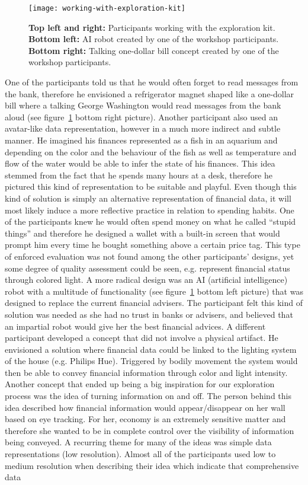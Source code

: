 \begin{figure}[!h]
	\centering
	\texttt{[image: working-with-exploration-kit]}
	\caption{\textbf{Top left and right:} Participants working with the exploration kit. \textbf{Bottom left:} AI robot created by one of the workshop participants. \textbf{Bottom right:} Talking one-dollar bill concept created by one of the workshop participants.}
	\label{fig:working-with-exploration-kit}
\end{figure}

One of the participants told us that he would often forget to read messages from the bank, therefore he envisioned a refrigerator magnet shaped like a one-dollar bill where a talking George Washington would read messages from the bank aloud (see figure~\ref{fig:working-with-exploration-kit} bottom right picture). Another participant also used an avatar-like data representation, however in a much more indirect and subtle manner. He imagined his finances represented as a fish in an aquarium and depending on the color and the behaviour of the fish as well as temperature and flow of the water would be able to infer the state of his finances. This idea stemmed from the fact that he spends many hours at a desk, therefore he pictured this kind of representation to be suitable and playful. Even though this kind of solution is simply an alternative representation of financial data, it will most likely induce a more reflective practice in relation to spending habits. One of the participants knew he would often spend money on what he called “stupid things” and therefore he designed a wallet with a built-in screen that would prompt him every time he bought something above a certain price tag. This type of enforced evaluation was not found among the other participants’ designs, yet some degree of quality assessment could be seen, e.g. represent financial status through colored light. A more radical design was an AI (artificial intelligence) robot with a multitude of functionality (see figure~\ref{fig:working-with-exploration-kit} bottom left picture) that was designed to replace the current financial advisers. The participant felt this kind of solution was needed as she had no trust in banks or advisers, and believed that an impartial robot would give her the best financial advices. A different participant developed a concept that did not involve a physical artifact. He envisioned a solution where financial data could be linked to the lighting system of the house (e.g. Philips Hue). Triggered by bodily movement the system would then be able to convey financial information through color and light intensity. Another concept that ended up being a big inspiration for our exploration process was the idea of turning information on and off. The person behind this idea described how financial information would appear/disappear on her wall based on eye tracking. For her, economy is an extremely sensitive matter and therefore she wanted to be in complete control over the visibility of information being conveyed. A recurring theme for many of the ideas was simple data representations (low resolution). Almost all of the participants used low to medium resolution when describing their idea which indicate that comprehensive data 
